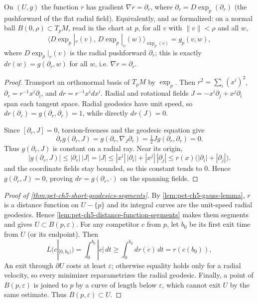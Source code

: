 \begin{lemma}
  \label{lem:pet-ch5-gauss-lemma}


  On $(U,g)$ the function $r$ has gradient $\nabla r=\partial_r$, where
  $\partial_r=D\exp_p(\partial_r)$ (the pushforward of the flat radial field).
  Equivalently, and as formalized: on a normal ball $B(0,\rho)\subset T_pM$,
  read in the chart at $p$, for all $v$ with $\|v\|<\rho$ and all $w$,
  \[
    \big\langle D\exp_p|_v(v),\,D\exp_p|_v(w)\big\rangle_{\exp_p(v)}=g_p(v,w),
  \]
  where $D\exp_p|_v(v)$ is the radial pushforward $\partial_r$; this is exactly
  $dr(w)=g(\partial_r,w)$ for all $w$, i.e. $\nabla r=\partial_r$.
\end{lemma}
\begin{proof}
  \sketch
  Transport an orthonormal basis of $T_pM$ by $\exp_p$.  Then
  $r^2=\sum_i(x^i)^2$, $\partial_r=r^{-1}x^i\partial_i$, and
  $dr=r^{-1}x^idx^i$.  Radial and rotational fields
  $J=-x^i\partial_j+x^j\partial_i$ span each tangent space.  Radial geodesics have
  unit speed, so $dr(\partial_r)=g(\partial_r,\partial_r)=1$, while directly
  $dr(J)=0$.

  Since $[\partial_r,J]=0$, torsion-freeness and the geodesic equation give
  \[
    \partial_rg(\partial_r,J)
    =g(\partial_r,\nabla_J\partial_r)
    =\tfrac12Jg(\partial_r,\partial_r)=0.
  \]
  Thus $g(\partial_r,J)$ is constant on a radial ray.  Near its origin,
  \[
    |g(\partial_r,J)|\le|\partial_r|\,|J|=|J|\le|x^i|\,|\partial_i|+|x^j|\,|\partial_j|
    \le r(x)\big(|\partial_i|+|\partial_j|\big).
  \]
  and the coordinate fields stay bounded, so this constant tends to $0$.  Hence
  $g(\partial_r,J)=0$, proving $dr=g(\partial_r,\cdot)$ on the spanning fields.
\end{proof}
\begin{proof}[Proof of \cref{thm:pet-ch5-short-geodesics-segments}]
  \sketch
  By \cref{lem:pet-ch5-gauss-lemma}, $r$ is a distance function on $U-\{p\}$ and
  its integral curves are the unit-speed radial geodesics.  Hence
  \cref{lem:pet-ch5-distance-function-segments} makes them segments and gives
  $U\subset B(p,\varepsilon)$.  For any competitor $c$ from $p$, let $b_0$ be its
  first exit time from $U$ (or its endpoint).  Then
  \[
    L(c|_{[0,b_0)})=\int_0^{b_0}|\dot c|\,dt\ge\int_0^{b_0}dr(\dot c)\,dt=r(c(b_0)),
  \]
  An exit through $\partial U$ costs at least $\varepsilon$; otherwise equality
  holds only for a radial velocity, so every minimizer reparametrizes the radial
  geodesic.  Finally, a point of $B(p,\varepsilon)$ is joined to $p$ by a curve of
  length below $\varepsilon$, which cannot exit $U$ by the same estimate.  Thus
  $B(p,\varepsilon)\subset U$.
\end{proof}

